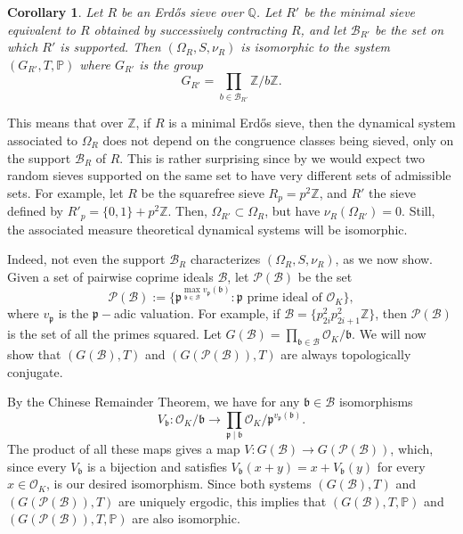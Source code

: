 \documentclass[a4paper,11pt,reqno]{amsart}
\theoremstyle{plain}
\newtheorem{corollary}[theorem]{Corollary}
\theoremstyle{remark}
\newcommand{\q}{\mathbb{Q}}
\newcommand{\z}{\mathbb{Z}}
\newcommand{\cb}{\mathcal{B}}
\newcommand{\co}{\mathcal{O}}
\newcommand{\cp}{\mathcal{P}}
\newcommand{\gb}{\mathfrak{b}}
\newcommand{\gp}{\mathfrak{p}}
\newcommand{\mmp}{\mathbb{P}}
\begin{document}
			
			\begin{corollary}
				\label{crl: Sieves over Q are all isomorphic to odometer}
				Let $R$ be an Erdős sieve over $\q$. Let $R'$ be the minimal sieve equivalent to $R$ obtained by successively contracting $R$, and let $\cb_{R'}$ be the set on which $R'$ is supported. Then $(\Omega_R,S,\nu_R)$ is isomorphic to the system $(G_{R'},T,\mmp)$ where $G_{R'}$ is the group $$G_{R'} = \prod_{b \in \cb_{R'}} \z/b\z.$$
			\end{corollary}
			
			
			
			
			This means that over $\z$, if $R$ is a minimal Erdős sieve, then the dynamical system associated to $\Omega_R$ does not depend on the congruence classes being sieved, only on the support $\cb_R$ of $R$. This is rather surprising since by   we would expect two random sieves supported on the same set to have very different sets of admissible sets. For example, let $R$ be the squarefree sieve $R_p = p^2\z$, and $R'$ the sieve defined by $R'_p = \{0,1\}+p^2\z$. Then, $\Omega_{R'} \subset \Omega_R$, but have $\nu_R(\Omega_{R'}) = 0$. Still, the associated measure theoretical dynamical systems will be isomorphic.
			
			
			Indeed, not even the support  $\cb_R$ characterizes $(\Omega_R,S,\nu_R)$, as we now show. Given a set of pairwise coprime ideals $\cb$, let $\cp(\cb)$ be the set
			\begin{equation}
				\label{eq: def of cp}
				\cp(\cb) := \{\gp^{\max_{\gb \in \cb}v_\gp(\gb)}: \gp \text{ prime ideal of } \co_K\},
			\end{equation} where $v_\gp$ is the $\gp-$adic valuation. For example, if $\cb = \{p_{2i}^2p_{2i+1}^2\z\}$, then $\cp(\cb)$ is the set of all the primes squared. Let $G(\cb) = \prod_{\gb \in \cb} \co_K/\gb$. We will now show that $(G(\cb),T)$ and $(G(\cp(\cb)),T)$ are always topologically conjugate. 
			
			By the Chinese Remainder Theorem, we have for any $\gb \in \cb$ isomorphisms $$V_\gb: \co_K/\gb  \rightarrow \prod_{\gp \mid \gb}\co_K/\gp^{v_\gp(\gb)}. $$
			The product of all these maps gives a map $V:G(\cb) \rightarrow G(\cp(\cb)) $, which, since every $V_\gb$ is a bijection and satisfies $V_\gb(x+y) = x + V_\gb(y)$ for every $x \in \co_K$, is our desired isomorphism. Since both systems $(G(\cb),T)$ and $(G(\cp(\cb)),T)$ are uniquely ergodic, this implies that  $(G(\cb),T,\mmp)$ and $(G(\cp(\cb)),T,\mmp)$ are also isomorphic.
			
\end{document}
